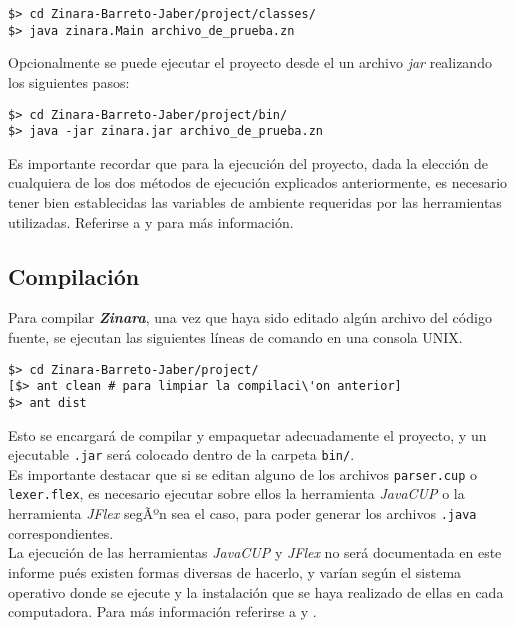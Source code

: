 \documentclass[12pt, spanish]{report}
\begin{document}
\begin{verbatim}
$> cd Zinara-Barreto-Jaber/project/classes/
$> java zinara.Main archivo_de_prueba.zn
\end{verbatim}

Opcionalmente se puede ejecutar el proyecto desde el un archivo
\emph{jar} realizando los siguientes pasos:

\begin{verbatim}
$> cd Zinara-Barreto-Jaber/project/bin/
$> java -jar zinara.jar archivo_de_prueba.zn
\end{verbatim}


Es importante recordar que para la ejecuci\'on del proyecto, dada la
elecci\'on de cualquiera de los dos m\'etodos de ejecuci\'on explicados
anteriormente, es necesario tener bien establecidas las variables de
ambiente requeridas por las herramientas utilizadas. Referirse a
\cite{javacup} y \cite{jflex} para m\'as informaci\'on.

\subsection{Compilaci\'on}
\label{sec:compilacion}
Para compilar \emph{\textbf{Zinara}}, una vez que haya sido editado
alg\'un archivo del c\'odigo fuente, se ejecutan las siguientes l\'ineas de
comando en una consola UNIX.

\begin{verbatim}
$> cd Zinara-Barreto-Jaber/project/
[$> ant clean # para limpiar la compilaci\'on anterior]
$> ant dist
\end{verbatim}

Esto se encargar\'a de compilar y empaquetar adecuadamente el proyecto,
y un ejecutable \texttt{.jar} ser\'a colocado dentro de la carpeta
\texttt{bin/}.\\

Es importante destacar que si se editan alguno de los archivos
\texttt{parser.cup} o \texttt{lexer.flex}, es necesario ejecutar sobre
ellos la herramienta \emph{JavaCUP} o la herramienta \emph{JFlex}
segÃºn sea el caso, para poder generar los archivos \texttt{.java}
correspondientes.\\

La ejecuci\'on de las herramientas \emph{JavaCUP} y \emph{JFlex} no ser\'a
documentada en este informe pu\'es existen formas diversas de hacerlo, y
var\'ian seg\'un el sistema operativo donde se ejecute y la instalaci\'on
que se haya realizado de ellas en cada computadora. Para m\'as
informaci\'on referirse a \cite{javacup} y \cite{jflex}.\\
\end{document}
